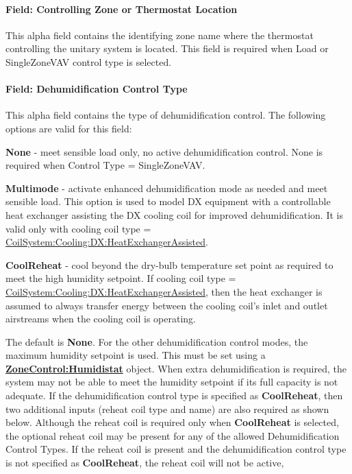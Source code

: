 \paragraph{Field: Controlling Zone or Thermostat Location}\label{field-controlling-zone-or-thermostat-location}

This alpha field contains the identifying zone name where the thermostat controlling the unitary system is located. This field is required when Load or SingleZoneVAV control type is selected.

\paragraph{Field: Dehumidification Control Type}\label{field-dehumidification-control-type-001}

This alpha field contains the type of dehumidification control. The following options are valid for this field:

\textbf{None} - meet sensible load only, no active dehumidification control. None is required when Control Type = SingleZoneVAV.

\textbf{Multimode} - activate enhanced dehumidification mode as needed and meet sensible load. This option is used to model DX equipment with a controllable heat exchanger assisting the DX cooling coil for improved dehumidification. It is valid only with cooling coil type = \hyperref[coilsystemcoolingdxheatexchangerassisted]{CoilSystem:Cooling:DX:HeatExchangerAssisted}.

\textbf{CoolReheat} - cool beyond the dry-bulb temperature set point as required to meet the high humidity setpoint. If cooling coil type = \hyperref[coilsystemcoolingdxheatexchangerassisted]{CoilSystem:Cooling:DX:HeatExchangerAssisted}, then the heat exchanger is assumed to always transfer energy between the cooling coil's inlet and outlet airstreams when the cooling coil is operating.

The default is \textbf{None}. For the other dehumidification control modes, the maximum humidity setpoint is used. This must be set using a \textbf{\hyperref[zonecontrolhumidistat]{ZoneControl:Humidistat}} object. When extra dehumidification is required, the system may not be able to meet the humidity setpoint if its full capacity is not adequate. If the dehumidification control type is specified as \textbf{CoolReheat}, then two additional inputs (reheat coil type and name) are also required as shown below. Although the reheat coil is required only when \textbf{CoolReheat} is selected, the optional reheat coil may be present for any of the allowed Dehumidification Control Types. If the reheat coil is present and the dehumidification control type is not specified as \textbf{CoolReheat}, the reheat coil will not be active,

